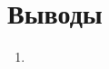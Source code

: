 \documentclass[../main/main.tex]{subfiles}
\begin{document}
    \newpage
    \section{Выводы}
    \label{sec:conclusions}
    \begin{enumerate}
        \item 
    \end{enumerate}
\end{document}
